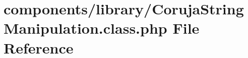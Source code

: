 \hypertarget{_coruja_string_manipulation_8class_8php}{
\section{components/library/CorujaStringManipulation.class.php File Reference}
\label{_coruja_string_manipulation_8class_8php}
}
